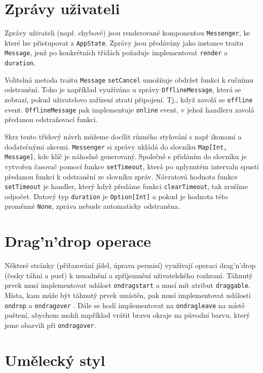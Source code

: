 \section{Zprávy uživateli} \label{userMessages}

Zprávy uživateli (např. chybové) jsou renderované komponentou \verb|Messenger|, ke které lze
přistupovat z \verb|AppState|. Zprávy jsou předávány jako instance traitu \verb|Message|,
jenž po konkrétních třídách požaduje implementovat \verb|render| a \verb|duration|.

Volitelná metoda traitu \verb|Message| \verb|setCancel| umožňuje obdržet funkci k ručnímu odstranění.
Toho je například využíváno u zprávy \verb|OfflineMessage|, která se zobrazí,
pokud uživatelovo zařízení ztratí připojení. Tj., když zavolá se \verb|offline| event.
\verb|OfflineMessage| pak implementuje \verb|online| event, v jehož handleru zavolá předanou
odstraňovací funkci.

Skrz tento třídový návrh můžeme docílit různého stylování s např ikonami a dodatečnými akcemi.
\verb|Messenger| si zprávy ukládá do slovníku \verb|Map[Int, Message]|, kde klíč je náhodně
generovaný. Společně s přidáním do slovníku je vytvořen časovač pomocí funkce \verb|setTimeout|,
která po uplynutém intervalu spustí předanou funkci k odstranění ze slovníku zpráv.
Návratová hodnota funkce \verb|setTimeout| je handler, který když předáme funkci \verb|clearTimeout|,
tak zrušíme odpočet.
Datový typ \verb|duration| je \verb|Option[Int]| a pokud je hodnota této proměnné \verb|None|,
zpráva nebude automaticky odstraněna.

\section{Drag'n'drop operace}

Některé stránky (přiřazování jídel, úprava permisí) využívají operaci drag'n'\-drop (česky táhni a pusť)
k usnadnění a zpříjemnění uživatelského rozhraní. Táhnutý prvek musí implementovat událost
\verb|ondragstart| a musí mít atribut \verb|draggable|. Místa, kam může být táhnutý prvek umístěn,
pak musí implementovat události \verb|ondrop| a \verb|ondragover| \citep[viz][]{W3DnD}.
Dále se hodí implementovat na \verb|ondragleave| na místě puštení, abychom mohli například
vrátit bravu okraje na původní barvu, který jsme obarvili při \verb|ondragover|.

\section{Umělecký styl}

